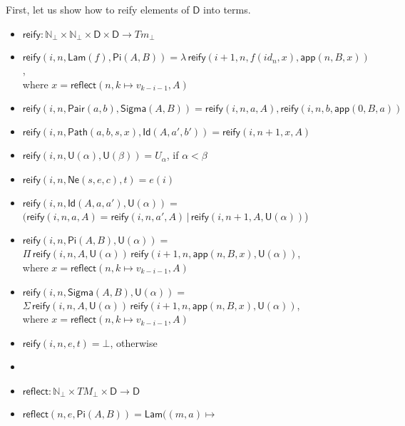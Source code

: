 \documentclass{amsart}
\theoremstyle{definition}
\theoremstyle{remark}
\newcommand{\D}{\mathsf{D}}
\newcommand{\nats}{\mathbb{N}}
\numberwithin{table}{section}
\begin{document}
First, let us show how to reify elements of $\D$ into terms.
\begin{itemize}
\item[] $\mathsf{reify} : \nats_\bot \times \nats_\bot \times \D \times \D \to Tm_\bot$
\item[] $\mathsf{reify}(i, n, \mathsf{Lam}(f), \mathsf{Pi}(A, B)) = \lambda\,\mathsf{reify}(i + 1, n, f(id_n, x), \mathsf{app}(n, B, x))$, \\
        \indent where $x = \mathsf{reflect}(n, k \mapsto v_{k - i - 1}, A)$
\item[] $\mathsf{reify}(i, n, \mathsf{Pair}(a, b), \mathsf{Sigma}(A, B)) = \mathsf{reify}(i, n, a, A), \mathsf{reify}(i, n, b, \mathsf{app}(0, B, a))$
\item[] $\mathsf{reify}(i, n, \mathsf{Path}(a, b, s, x), \mathsf{Id}(A, a', b')) = \mathsf{reify}(i, n + 1, x, A)$
\item[] $\mathsf{reify}(i, n, \mathsf{U}(\alpha), \mathsf{U}(\beta)) = U_\alpha$, if $\alpha < \beta$
\item[] $\mathsf{reify}(i, n, \mathsf{Ne}(s, e, c), t) = e(i)$
\item[] $\mathsf{reify}(i, n, \mathsf{Id}(A, a, a'), \mathsf{U}(\alpha)) =$ \\
        \indent $(\mathsf{reify}(i, n, a, A) = \mathsf{reify}(i, n, a', A)\,|\,\mathsf{reify}(i, n + 1, A, \mathsf{U}(\alpha))$)
\item[] $\mathsf{reify}(i, n, \mathsf{Pi}(A, B), \mathsf{U}(\alpha)) =$ \\
        \indent $\Pi\,\mathsf{reify}(i, n, A, \mathsf{U}(\alpha))\,\mathsf{reify}(i + 1, n, \mathsf{app}(n, B, x), \mathsf{U}(\alpha))$, \\
        \indent where $x = \mathsf{reflect}(n, k \mapsto v_{k - i - 1}, A)$
\item[] $\mathsf{reify}(i, n, \mathsf{Sigma}(A, B), \mathsf{U}(\alpha)) = $ \\
        \indent $\Sigma\,\mathsf{reify}(i, n, A, \mathsf{U}(\alpha))\,\mathsf{reify}(i + 1, n, \mathsf{app}(n, B, x), \mathsf{U}(\alpha))$, \\
        \indent where $x = \mathsf{reflect}(n, k \mapsto v_{k - i - 1}, A)$
\item[] $\mathsf{reify}(i, n, e, t) = \bot$, otherwise
\item[]
\item[] $\mathsf{reflect} : \nats_\bot \times TM_\bot \times \D \to \D$
\item[] $\mathsf{reflect}(n, e, \mathsf{Pi}(A, B)) = \mathsf{Lam}((m, a) \mapsto $ \\

\end{itemize}
\end{document}
